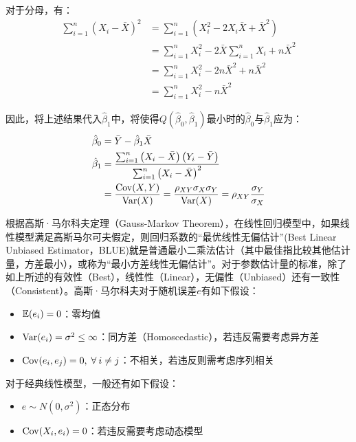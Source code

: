 \documentclass[11pt]{article}
\begin{document}
对于分母，有：
\begin{align*}
    \sum_{i=1}^{n} \left(X_i - \bar{X}\right)^2
    &= \sum_{i=1}^{n} \left( X_i^2 - 2 X_i\bar{X} + \bar{X}^2 \right) \\
    &= \sum_{i=1}^{n} X_i^2 - 2 \bar{X} \sum_{i=1}^{n} X_i + n\bar{X}^2 \\
    &= \sum_{i=1}^{n} X_i^2 - 2 n \bar{X}^2 + n\bar{X}^2 \\
    &= \sum_{i=1}^{n} X_i^2 - n \bar{X}^2 
\end{align*}

因此，将上述结果代入$\hat{\beta}_1$中，将使得$Q(\hat{\beta}_0,\hat{\beta}_1)$最小时的$\hat{\beta}_0$与$\hat{\beta}_1$应为：
\begin{align*}
    \hat{\beta}_0 &= \bar{Y} - \hat{\beta}_1 \bar{X} \\
    \hat{\beta}_1 &= \frac{\sum_{i=1}^{n} \left(X_i - \bar{X}\right) \left(Y_i - \bar{Y}\right)}{\sum_{i=1}^{n} \left(X_i - \bar{X}\right)^2} \\
    &= \frac{\operatorname{Cov}(X,Y)}{\operatorname{Var}(X)} = \frac{\rho_{XY} \sigma_X \sigma_Y}{\operatorname{Var}(X)} = \rho_{XY} \frac{\sigma_Y}{\sigma_X}
\end{align*}

根据高斯·马尔科夫定理（Gauss-Markov Theorem），在线性回归模型中，如果线性模型满足高斯马尔可夫假定，则回归系数的“最优线性无偏估计”(Best Linear Unbiased Estimator，BLUE)就是普通最小二乘法估计（其中最佳指比较其他估计量，方差最小），或称为“最小方差线性无偏估计”。对于参数估计量的标准，除了如上所述的有效性（Best），线性性（Linear），无偏性（Unbiased）还有一致性（Consistent）。高斯·马尔科夫对于随机误差$e$有如下假设：
\begin{itemize}
    \item $\mathbb{E}(e_i)=0$：零均值
    \item $\operatorname{Var}(e_i) = \sigma^2 \leq \infty$：同方差（Homoscedastic），若违反需要考虑异方差
    \item $\Cov(e_i,e_j) = 0,\; \forall i\neq j$：不相关，若违反则需考虑序列相关
\end{itemize}

对于经典线性模型，一般还有如下假设：
\begin{itemize}
    \item $e \sim N(0,\sigma^2)$：正态分布
    \item $\operatorname{Cov}(X_i,e_i) = 0$：若违反需要考虑动态模型
\end{itemize}
\end{document}
